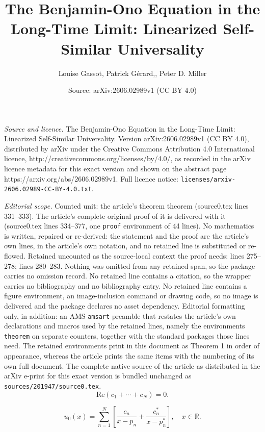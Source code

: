 \documentclass[10pt,a4paper]{amsart}
\title{The Benjamin-Ono Equation in the Long-Time Limit: Linearized Self-Similar Universality}
\author{Louise Gassot, Patrick G\'erard,, Peter D. Miller}
\date{Source: arXiv:2606.02989v1 (CC BY 4.0)}
\begin{document}
\maketitle

\noindent\emph{Source and licence.} The Benjamin-Ono Equation in the Long-Time Limit: Linearized Self-Similar Universality. Version arXiv:2606.02989v1 (CC BY 4.0), distributed by arXiv under the Creative Commons Attribution 4.0 International licence, http://creativecommons.org/licenses/by/4.0/, as recorded in the arXiv licence metadata for this exact version and shown on the abstract page https://arxiv.org/abs/2606.02989v1. Full licence notice: \texttt{licenses/arxiv-2606.02989-CC-BY-4.0.txt}.\par\smallskip

\noindent\textit{Editorial scope.} Counted unit: the article's theorem theorem (source0.tex lines 331--333). The article's complete original proof of it is delivered with it (source0.tex lines 334--377, one \texttt{proof} environment of 44 lines). No mathematics is written, repaired or re-derived: the statement and the proof are the article's own lines, in the article's own notation, and no retained line is substituted or re-flowed.  Retained uncounted as the source-local context the proof needs: lines 275--278; lines 280--283.  Nothing was omitted from any retained span, so the package carries no omission record.  No retained line contains a citation, so the wrapper carries no bibliography and no bibliography entry.  No retained line contains a figure environment, an image-inclusion command or drawing code, so no image is delivered and the package declares no asset dependency.  Editorial formatting only, in addition: an AMS \texttt{amsart} preamble that restates the article's own declarations and macros used by the retained lines, namely the environments \texttt{theorem} on separate counters, together with the standard packages those lines need.  The retained environments print in this document as Theorem 1 in order of appearance, whereas the article prints the same items with the numbering of its own full document.  The complete native source of the article as distributed in the arXiv e-print for this exact version is bundled unchanged as \texttt{sources/201947/source0.tex}.
\begin{equation}
\mathrm{Re}(c_1+\cdots+c_N)=0.      
\label{eq:XS-u0-in-L1}
\end{equation}

\begin{equation}
        u_0(x)=\sum_{n=1}^N\left[\frac{c_n}{x-p_n} + \frac{c_n^*}{x-p_n^*}\right],\quad x\in\mathbb{R}.
    \label{eq:XS-u0-rational}
\end{equation}
\end{document}
